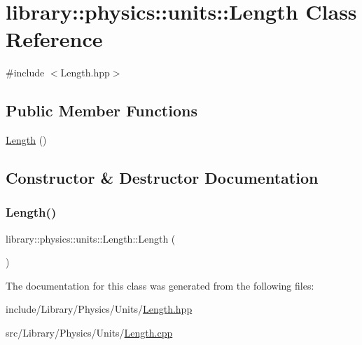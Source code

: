 \hypertarget{classlibrary_1_1physics_1_1units_1_1_length}{}\section{library\+:\+:physics\+:\+:units\+:\+:Length Class Reference}
\label{classlibrary_1_1physics_1_1units_1_1_length}


{\ttfamily \#include $<$Length.\+hpp$>$}

\subsection*{Public Member Functions}
\begin{DoxyCompactItemize}
\item 
\hyperlink{classlibrary_1_1physics_1_1units_1_1_length_abc75d349b771abc33d0e1a8bbac73a53}{Length} ()
\end{DoxyCompactItemize}


\subsection{Constructor \& Destructor Documentation}
\mbox{\label{classlibrary_1_1physics_1_1units_1_1_length_abc75d349b771abc33d0e1a8bbac73a53}} 
\subsubsection{\texorpdfstring{Length()}{Length()}}
{\footnotesize\ttfamily library\+::physics\+::units\+::\+Length\+::\+Length (\begin{DoxyParamCaption}{ }\end{DoxyParamCaption})}



The documentation for this class was generated from the following files\+:\begin{DoxyCompactItemize}
\item 
include/\+Library/\+Physics/\+Units/\hyperlink{_length_8hpp}{Length.\+hpp}\item 
src/\+Library/\+Physics/\+Units/\hyperlink{_length_8cpp}{Length.\+cpp}\end{DoxyCompactItemize}
